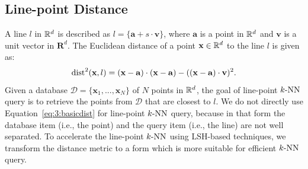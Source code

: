\subsection{Line-point Distance}
A line $l$ in $\mathbb R^d$ is described as $l = \{\mathbf a + s \cdot \mathbf v\}$, where $\mathbf a$ is a point in $\mathbb R^d$ and $\mathbf v$ is a unit vector in $\mathbf R^d$.
The Euclidean distance of a point $\mathbf x \in \mathbb R^d$ to the line $l$ is given as:
\begin{equation}
\label{eq:3:basicdist}
  \operatorname{dist}^2(\mathbf x, l) = (\mathbf x - \mathbf a) \cdot (\mathbf x - \mathbf a) - ((\mathbf x - \mathbf a) \cdot \mathbf v)^2.
\end{equation}
Given a database $\mathcal D = \{\mathbf x_1, ..., \mathbf x_N\}$ of $N$ points in $\mathbb R^d$, the goal of line-point $k\text{-NN}$ query is to retrieve the points from $\mathcal D$ that are closest to $l$. We do not directly use Equation~\ref{eq:3:basicdist} for line-point $k\text{-NN}$ query, because in that form the database item (i.e., the point) and the query item (i.e., the line) are not well separated. To accelerate the line-point $k\text{-NN}$ using LSH-based techniques, we transform the distance metric to a form which is more suitable for efficient $k\text{-NN}$ query.

